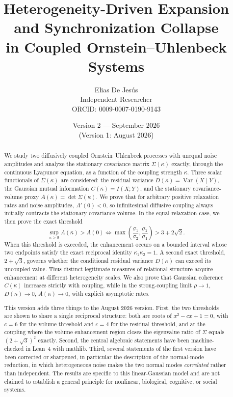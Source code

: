 \documentclass[11pt]{article}
\title{Heterogeneity-Driven Expansion and Synchronization Collapse\\
in Coupled Ornstein--Uhlenbeck Systems}
\author{Elias De Jes\'us\\
Independent Researcher\\
ORCID: 0009-0007-0190-9143}
\date{Version 2 --- September 2026\\[2pt]
\small (Version 1: August 2026)}
\theoremstyle{plain}
\theoremstyle{remark}
\newcommand{\Var}{\operatorname{Var}}
\newcommand{\I}{I}
\begin{document}
\maketitle

\begin{abstract}
We study two diffusively coupled Ornstein--Uhlenbeck processes with unequal noise amplitudes
and analyze the stationary covariance matrix $\Sigma(\kappa)$ exactly, through the continuous
Lyapunov equation, as a function of the coupling strength $\kappa$. Three scalar functionals of
$\Sigma(\kappa)$ are considered: the residual variance $D(\kappa)=\Var(X\mid Y)$, the Gaussian
mutual information $C(\kappa)=\I(X;Y)$, and the stationary covariance-volume proxy
$A(\kappa)=\det\Sigma(\kappa)$. We prove that for arbitrary positive relaxation rates and noise
amplitudes, $A'(0)<0$, so infinitesimal diffusive coupling always initially contracts the
stationary covariance volume. In the equal-relaxation case, we then prove the exact threshold
\[
  \sup_{\kappa>0}A(\kappa)>A(0)
  \iff
  \max\!\left(\frac{\sigma_1}{\sigma_2},\frac{\sigma_2}{\sigma_1}\right)>3+2\sqrt{2}.
\]
When this threshold is exceeded, the enhancement occurs on a bounded interval whose two
endpoints satisfy the exact reciprocal identity $\kappa_1\kappa_2=1$. A second exact threshold,
$2+\sqrt{3}$, governs whether the conditional residual variance $D(\kappa)$ can exceed its
uncoupled value. Thus distinct legitimate measures of relational structure acquire enhancement
at different heterogeneity scales. We also prove that Gaussian coherence $C(\kappa)$ increases
strictly with coupling, while in the strong-coupling limit $\rho\to1$, $D(\kappa)\to0$,
$A(\kappa)\to0$, with explicit asymptotic rates.

This version adds three things to the August 2026 version. First, the two thresholds are shown
to share a single reciprocal structure: both are roots of $x^2-cx+1=0$, with $c=6$ for the
volume threshold and $c=4$ for the residual threshold, and at the coupling where the volume
enhancement region closes the eigenvalue ratio of $\Sigma$ equals $(2+\sqrt{3})^2$ exactly.
Second, the central algebraic statements have been machine-checked in Lean~4 with mathlib.
Third, several statements of the first version have been corrected or sharpened, in particular
the description of the normal-mode reduction, in which heterogeneous noise makes the two
normal modes \emph{correlated} rather than independent. The results are specific to this
linear-Gaussian model and are not claimed to establish a general principle for nonlinear,
biological, cognitive, or social systems.
\end{abstract}
\end{document}

